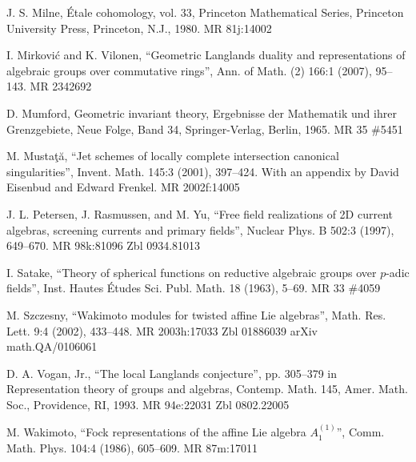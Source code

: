 \par\noindent [Milne 1980] J. S. Milne, \'Etale cohomology, vol. 33, Princeton Mathematical Series, Princeton University Press, Princeton, N.J., 1980. MR 81j:14002

\par{} I. Mirkovi\'c and K. Vilonen, ``Geometric Langlands duality and representations of algebraic groups over commutative rings'', Ann. of Math. (2) 166:1 (2007), 95--143. MR 2342692

\par\noindent [Mumford 1965] D. Mumford, Geometric invariant theory, Ergebnisse der Mathematik und ihrer Grenzgebiete, Neue Folge, Band 34, Springer-Verlag, Berlin, 1965. MR 35 \#5451

\par\noindent [Musta\c{t}\u{a} 2001] M. Musta\c{t}\u{a}, ``Jet schemes of locally complete intersection canonical singularities'', Invent. Math. 145:3 (2001), 397--424. With an appendix by David Eisenbud and Edward Frenkel. MR 2002f:14005

\par\noindent [Petersen et al. 1997] J. L. Petersen, J. Rasmussen, and M. Yu, ``Free field realizations of 2D current algebras, screening currents and primary fields'', Nuclear Phys. B 502:3 (1997), 649--670. MR 98k:81096 Zbl 0934.81013

\par\noindent [Satake 1963] I. Satake, ``Theory of spherical functions on reductive algebraic groups over $p$-adic fields'', Inst. Hautes \'Etudes Sci. Publ. Math. 18 (1963), 5--69. MR 33 \#4059

\par\noindent [Szczesny 2002] M. Szczesny, ``Wakimoto modules for twisted affine Lie algebras'', Math. Res. Lett. 9:4 (2002), 433--448. MR 2003h:17033 Zbl 01886039 arXiv math.QA/0106061

\par\noindent [Vogan 1993] D. A. Vogan, Jr., ``The local Langlands conjecture'', pp. 305--379 in Representation theory of groups and algebras, Contemp. Math. 145, Amer. Math. Soc., Providence, RI, 1993. MR 94e:22031 Zbl 0802.22005

\par\noindent [Wakimoto 1986] M. Wakimoto, ``Fock representations of the affine Lie algebra $A_1^{(1)}$'', Comm. Math. Phys. 104:4 (1986), 605--609. MR 87m:17011
